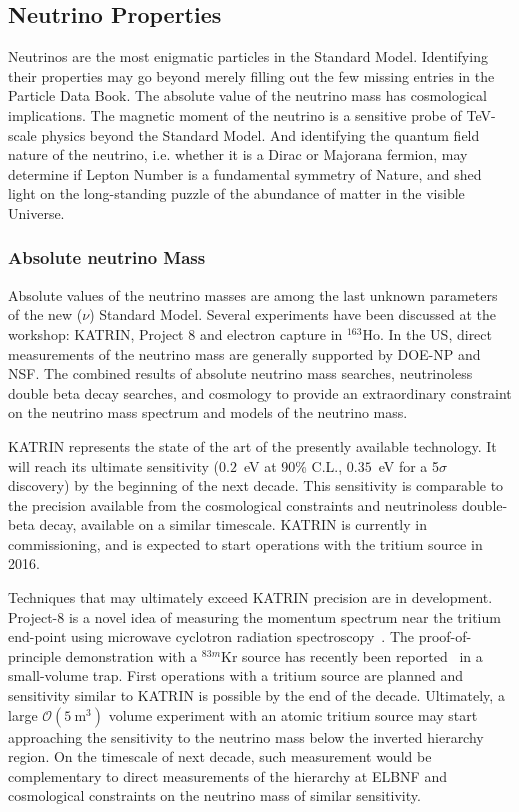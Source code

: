 \subsection{Neutrino Properties}
\label{sec:Properties}

Neutrinos are the most enigmatic particles in the Standard
Model. Identifying their properties may go beyond merely filling out
the few missing entries in the Particle Data Book. The absolute value
of the neutrino mass has cosmological implications. The magnetic
moment of the neutrino is a sensitive probe of TeV-scale physics
beyond the Standard Model. And identifying the quantum field nature of
the neutrino, i.e. whether it is a Dirac or Majorana fermion, may
determine if Lepton Number is a fundamental symmetry of Nature, and
shed light on the long-standing puzzle of the abundance of matter in
the visible Universe.

\subsubsection{Absolute neutrino Mass}

Absolute values of the neutrino masses are among the last unknown
parameters of the new ($\nu$) Standard Model. Several experiments
have been discussed at the workshop: KATRIN, Project 8 and electron
capture in $^{163}$Ho. In the US, direct measurements of the neutrino
mass are generally supported by DOE-NP and NSF.   The combined results
of absolute neutrino mass searches,
neutrinoless double beta decay searches, and cosmology to provide an
extraordinary constraint on the neutrino mass spectrum and models of the
neutrino mass.

KATRIN represents the state of the art of the presently available
technology. It will reach its ultimate sensitivity ($0.2$~eV at 90\%
C.L., $0.35$~eV for a 5$\sigma$ discovery) by the beginning of the
next decade. This sensitivity is comparable to the precision
available from the cosmological constraints and neutrinoless
double-beta decay, available on a similar timescale. KATRIN is
currently in commissioning, and is expected to start operations with
the tritium source in 2016.

Techniques that may ultimately exceed KATRIN precision are in
development. Project-8 is a novel idea of measuring the momentum
spectrum near the tritium end-point using microwave cyclotron
radiation spectroscopy~\cite{Monreal:2009za}. The proof-of-principle
demonstration with a $^{83m}$Kr source has recently been
reported~\cite{Asner:2014cwa} in a small-volume trap. First operations
with a tritium source are planned and sensitivity similar to KATRIN is
possible by the end of the decade. Ultimately, a large
$\mathcal{O}(5~\mathrm{m}^3)$ volume experiment with an atomic tritium
source may start approaching the sensitivity to the neutrino mass
below the inverted hierarchy region. On the timescale of next decade,
such measurement would be complementary to direct measurements of the
hierarchy at ELBNF and cosmological constraints on the neutrino mass
of similar sensitivity.

